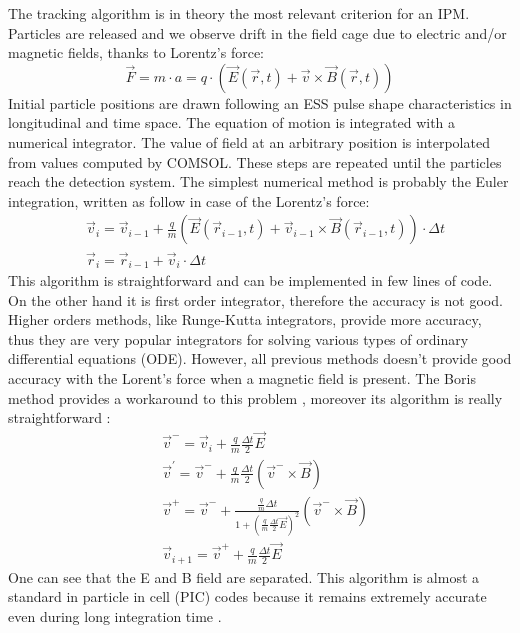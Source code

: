 \begin{refsection}
  The tracking algorithm is in theory the most relevant criterion for an IPM. Particles are released and we observe drift in the field cage due to electric and/or magnetic fields, thanks to Lorentz’s force: 
  \begin{equation}
    \vec{F} = m \cdot a = q \cdot (\vec{E}(\vec{r},t) + \vec{v} \times \vec{B}(\vec{r},t))
  \end{equation}
  Initial particle positions are drawn following an ESS pulse shape characteristics in longitudinal and time space. The equation of motion is integrated with a numerical integrator. The value of field at an arbitrary position is interpolated from values computed by COMSOL. These steps are repeated until the particles reach the detection system. The simplest numerical method is probably the Euler integration, written as follow in case of the Lorentz’s force:
  \begin{align}
    & \vec{v}_{i} = \vec{v}_{i-1} + \frac{q}{m}(\vec{E}(\vec{r}_{i-1},t) + \vec{v}_{i-1} \times \vec{B}(\vec{r}_{i-1},t)) \cdot \Delta t \\
    & \vec{r}_{i} = \vec{r}_{i-1} + \vec{v}_{i} \cdot \Delta t
  \end{align}
  This algorithm is straightforward and can be implemented in few lines of code. On the other hand it is first order integrator, therefore the accuracy is not good. Higher orders methods, like Runge-Kutta integrators, provide more accuracy, thus they are very popular integrators for solving various types of ordinary differential equations (ODE). However, all previous methods doesn’t provide good accuracy with the Lorent’s force when a magnetic field is present. The Boris method provides a workaround to this problem \cite{Boris1970}, moreover its algorithm is really straightforward :
  \begin{align}
     & \vec{v}^{-} = \vec{v}_{i} + \frac{q}{m} \frac{\Delta t}{2}\vec{E}\\
     & \vec{v}^{'} = \vec{v}^{-} + \frac{q}{m} \frac{\Delta t}{2}(\vec{v}^{-} \times \vec{B})\\
     & \vec{v}^{+} = \vec{v}^{-} + \frac{\frac{q}{m}\Delta t}{1+(\frac{q}{m} \frac{\Delta t}{2}\vec{E})^{2}}(\vec{v}^{-} \times \vec{B})\\
     & \vec{v}_{i+1} = \vec{v}^{+} + \frac{q}{m} \frac{\Delta t}{2}\vec{E}
  \end{align}
  One can see that the E and B field are separated. This algorithm is almost a standard in particle in cell (PIC) codes because it remains extremely accurate even during long integration time \cite{Qin2013}.
  

\end{refsection}
